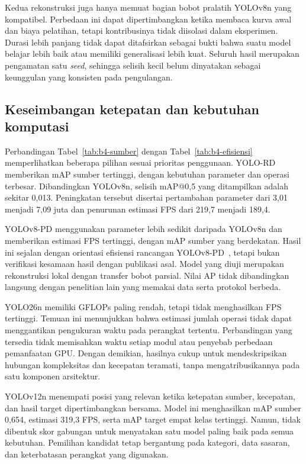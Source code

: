 Kedua rekonstruksi juga hanya memuat bagian bobot pralatih YOLOv8n yang kompatibel. Perbedaan ini dapat dipertimbangkan ketika membaca kurva awal dan biaya pelatihan, tetapi kontribusinya tidak diisolasi dalam eksperimen. Durasi lebih panjang tidak dapat ditafsirkan sebagai bukti bahwa suatu model belajar lebih baik atau memiliki generalisasi lebih kuat. Seluruh hasil merupakan pengamatan satu \textit{seed}, sehingga selisih kecil belum dinyatakan sebagai keunggulan yang konsisten pada pengulangan.

\subsection{Keseimbangan ketepatan dan kebutuhan komputasi}
Perbandingan Tabel~\ref{tab:b4-sumber} dengan Tabel~\ref{tab:b4-efisiensi} memperlihatkan beberapa pilihan sesuai prioritas penggunaan. YOLO-RD memberikan mAP sumber tertinggi, dengan kebutuhan parameter dan operasi terbesar. Dibandingkan YOLOv8n, selisih mAP@0,5 yang ditampilkan adalah sekitar 0,013. Peningkatan tersebut disertai pertambahan parameter dari 3,01 menjadi 7,09 juta dan penurunan estimasi FPS dari 219,7 menjadi 189,4.

YOLOv8-PD menggunakan parameter lebih sedikit daripada YOLOv8n dan memberikan estimasi FPS tertinggi, dengan mAP sumber yang berdekatan. Hasil ini sejalan dengan orientasi efisiensi rancangan YOLOv8-PD~\cite{Zeng2024}, tetapi bukan verifikasi kesamaan hasil dengan publikasi asal. Model yang diuji merupakan rekonstruksi lokal dengan transfer bobot parsial. Nilai AP tidak dibandingkan langsung dengan penelitian lain yang memakai data serta protokol berbeda.

YOLO26n memiliki GFLOPs paling rendah, tetapi tidak menghasilkan FPS tertinggi. Temuan ini menunjukkan bahwa estimasi jumlah operasi tidak dapat menggantikan pengukuran waktu pada perangkat tertentu. Perbandingan yang tersedia tidak memisahkan waktu setiap modul atau penyebab perbedaan pemanfaatan GPU. Dengan demikian, hasilnya cukup untuk mendeskripsikan hubungan kompleksitas dan kecepatan teramati, tanpa mengatribusikannya pada satu komponen arsitektur.

YOLOv12n menempati posisi yang relevan ketika ketepatan sumber, kecepatan, dan hasil target dipertimbangkan bersama. Model ini menghasilkan mAP sumber 0,654, estimasi 319,3 FPS, serta mAP target empat kelas tertinggi. Namun, tidak dibentuk skor gabungan untuk menyatakan satu model paling baik pada semua kebutuhan. Pemilihan kandidat tetap bergantung pada kategori, data sasaran, dan keterbatasan perangkat yang digunakan.

